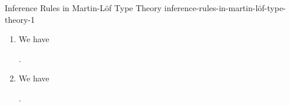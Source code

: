 \begin{definition}{Inference Rules in Martin-Löf Type Theory \rmI}{inference-rules-in-martin-löf-type-theory-1}
\begin{enumerate}
            \begin{webprooftree}%
                \begin{prooftree}%
                \end{prooftree}%
                .%
            \end{webprooftree}%
        \item\label{inference-rules-in-martin-löf-type-theory-1-formation-of-judgemental-equality-of-terms-1}We have
            \begin{webprooftree}%
                \begin{prooftree}%
                \end{prooftree}%
                .%
            \end{webprooftree}%
        \item\label{inference-rules-in-martin-löf-type-theory-1-formation-of-judgemental-equality-of-terms-3}We have
            \begin{webprooftree}%
                \begin{prooftree}%
                \end{prooftree}%
                .%
            \end{webprooftree}%
    \end{enumerate}
\end{definition}
